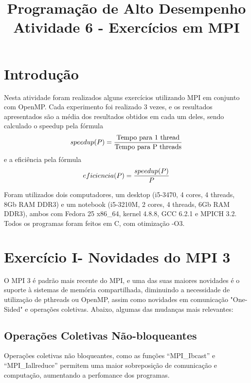 \documentclass[conference]{IEEEtran}
\begin{document}
\title{Programação de Alto Desempenho\\
\large Atividade 6 - Exercícios em MPI}

\author{
 }

\maketitle


\section{Introdução}
Nesta atividade foram realizados alguns exercícios utilizando MPI em conjunto com OpenMP.
Cada experimento foi realizado 3 vezes, e os resultados apresentados são a média dos resultados obtidos em cada um deles, sendo calculado o speedup pela fórmula $$speedup(P) = {{\textrm{Tempo para 1 thread} }\over{\textrm{Tempo para P threads} }}$$ e a eficiência pela fórmula $$eficiencia(P) = {{speedup(P)}\over{P}}$$


Foram utilizados dois computadores, um desktop (i5-3470, 4 cores, 4 threads, 8Gb RAM DDR3) e um notebook (i5-3210M, 2 cores, 4 threads, 6Gb RAM DDR3), ambos com Fedora 25 x86\_64, kernel 4.8.8, GCC 6.2.1 e MPICH 3.2. Todos os programas foram feitos em C, com otimização -O3.


\section{Exercício I- Novidades do MPI 3}

O MPI 3 é padrão mais recente do MPI, e uma das suas maiores novidades é o suporte à sistemas de memória compartilhada, diminuindo a necessidade de utilização de pthreads ou OpenMP, assim como novidades em comunicação "One-Sided" e operações coletivas. Abaixo, algumas das mudanças mais relevantes:

\subsection{Operações Coletivas Não-bloqueantes}
Operações coletivas não bloqueantes, como as funções ``MPI\_Ibcast'' e ``MPI\_Iallreduce'' permitem uma maior sobreposição de comunicação e computação, aumentando a perfomance dos programas.
\end{document}
